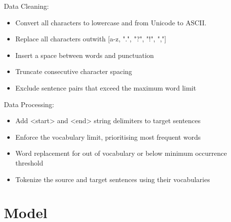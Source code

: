 Data Cleaning:
\begin{itemize}
    \item Convert all characters to lowercase and from Unicode to ASCII. %
    \item Replace all characters outwith [a-z, ".", "?", "!", ","]
    \item Insert a space between words and punctuation
    \item Truncate consecutive character spacing
    \item Exclude sentence pairs that exceed the maximum word limit
\end{itemize}

Data Processing:
\begin{itemize}
    \item Add <start> and <end> string delimiters to target sentences
    \item Enforce the vocabulary limit, prioritising most frequent words
    \item Word replacement for out of vocabulary or below minimum occurrence threshold
    \item Tokenize the source and target sentences using their vocabularies
\end{itemize}

\section{Model}
\label{sec:3-model}





